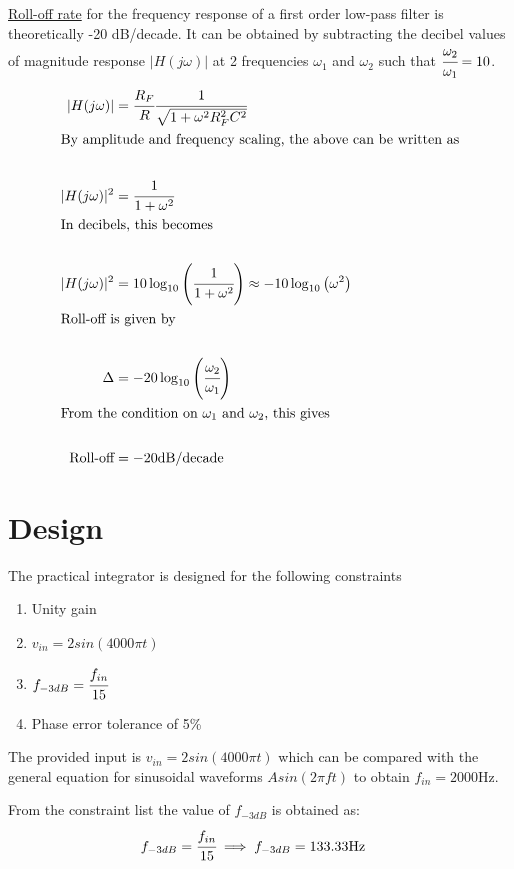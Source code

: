 \documentclass[12pt, titlepage]{article}
\theoremstyle{definition}
\begin{document}
    \underline{Roll-off rate} for the frequency response of a first order low-pass filter is theoretically -20 dB/decade.
    It can be obtained by subtracting the decibel values of magnitude response $|H(j\omega)|$ at 2 frequencies $\omega_1$ and $\omega_2$ such that $\cfrac{\omega_2}{\omega_1} = 10$.
    \begin{align*}
      |H(j\omega)| &= \cfrac{R_{F}}{R} \cfrac{1}{\sqrt{1+\omega^2 R_F^2 C^2}}\\
      \intertext{By amplitude and frequency scaling, the above can be written as}\\
      |H(j\omega)|^2 &= \cfrac{1}{1 + \omega^2}\\
      \intertext{In decibels, this becomes}\\
      |H(j\omega)|^2 &= 10\log_{10}\left(\cfrac{1}{1 + \omega^2}\right) \approx -10\log_{10}\left(\omega^2 \right)\\
      \intertext{Roll-off is given by }\\
      \Delta &= -20\log_{10}\left(\cfrac{\omega_2}{\omega_1}\right) \\
      \intertext{From the condition on $\omega_1$ and $\omega_2$, this gives}\\
      \text{Roll-off} &= -20 \text{dB/decade}
    \end{align*}

  \newpage
  \section{Design}
    The practical integrator is designed for the following constraints
    \begin{enumerate}[topsep=1pt, label=(\alph*)]
      \item Unity gain
      \item $v_{in} = 2sin(4000\pi t)$
      \item $f_{-3dB} = \cfrac{f_{in}}{15}$
      \item Phase error tolerance of 5\%
    \end{enumerate}

    The provided input is $v_{in} = 2 sin(4000\pi t)$ which can be compared with the general equation for sinusoidal waveforms $A sin(2\pi ft)$ to obtain \underline{$f_{in} = 2000\text{Hz}$}.

    From the constraint list the value of \underline{$f_{-3dB}$} is obtained as:
    \begin{align*}
      f_{-3dB} &= \cfrac{f_{in}}{15}
      \implies f_{-3dB} = 133.33\text{Hz}
    \end{align*}
\end{document}
